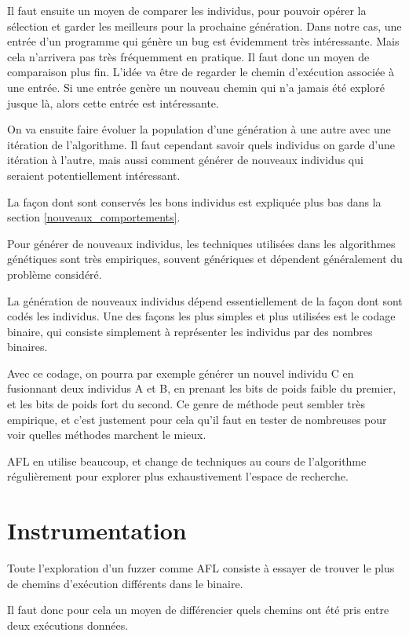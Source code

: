 Il faut ensuite un moyen de comparer les individus, pour pouvoir opérer la
sélection et garder les meilleurs pour la prochaine génération. Dans notre
cas, une entrée d'un programme qui génère un bug est évidemment très
intéressante. Mais cela n'arrivera pas très fréquemment en pratique. Il faut
donc un moyen de comparaison plus fin. L'idée va être de regarder le chemin
d'exécution associée à une entrée. Si une entrée genère un nouveau chemin
qui n'a jamais été exploré jusque là, alors cette entrée est intéressante.

On va ensuite faire évoluer la population d'une génération à une autre avec
une itération de l'algorithme. Il faut cependant savoir quels individus on
garde d'une itération à l'autre, mais aussi comment générer de nouveaux
individus qui seraient potentiellement intéressant.

La façon dont sont conservés les bons individus est expliquée plus bas dans
la section \ref{nouveaux_comportements}.

Pour générer de nouveaux individus, les techniques utilisées dans les
algorithmes génétiques sont très empiriques, souvent génériques et
dépendent généralement du problème considéré.

La génération de nouveaux individus dépend essentiellement de la façon
dont sont codés les individus. Une des façons les plus simples et plus
utilisées est le codage binaire, qui consiste simplement à représenter
les individus par des nombres binaires.

Avec ce codage, on pourra par exemple générer un nouvel individu C en
fusionnant deux individus A et B, en prenant les bits de poids faible
du premier, et les bits de poids fort du second. Ce genre de méthode
peut sembler très empirique, et c'est justement pour cela qu'il faut
en tester de nombreuses pour voir quelles méthodes marchent le mieux.

AFL en utilise beaucoup, et change de techniques au cours de l'algorithme
régulièrement pour explorer plus exhaustivement l'espace de recherche.

\section{Instrumentation}\label{instrumentation}

Toute l'exploration d'un fuzzer comme AFL consiste à  essayer de trouver le
plus de chemins d'exécution différents dans le binaire.

Il faut donc pour cela un moyen de différencier quels chemins ont été pris
entre deux exécutions données.

